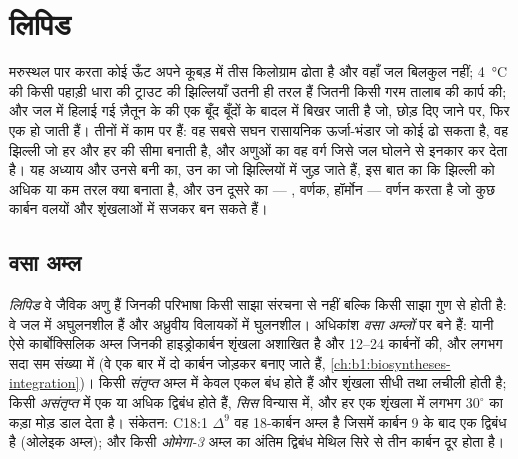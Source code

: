 \chapter{लिपिड}\label{ch:b1:lipids}

मरुस्थल पार करता कोई ऊँट अपने कूबड़ में तीस किलोग्राम  ढोता है और
वहाँ जल बिलकुल नहीं; \qty{4}{\celsius} की किसी पहाड़ी धारा की ट्राउट की
झिल्लियाँ उतनी ही तरल हैं जितनी किसी गरम तालाब की कार्प की; और जल में
हिलाई गई ज़ैतून के  की एक बूँद बूँदों के बादल में बिखर जाती है जो,
छोड़ दिए जाने पर, फिर एक हो जाती हैं। तीनों में  काम पर हैं: वह
सबसे सघन रासायनिक ऊर्जा-भंडार जो कोई  ढो सकता है, वह झिल्ली जो हर
 और हर  की सीमा बनाती है, और अणुओं का वह वर्ग जिसे जल
घोलने से इनकार कर देता है। यह अध्याय  और उनसे बनी  का, उन
  का जो झिल्लियों में जुड़ जाते हैं, इस बात का कि झिल्ली को
अधिक या कम तरल क्या बनाता है, और उन दूसरे  का --- , वर्णक,
हॉर्मोन --- वर्णन करता है जो कुछ कार्बन वलयों और शृंखलाओं में सजकर बन
सकते हैं।

\section{वसा अम्ल}

\begin{definition}[लिपिड, वसा अम्ल]\label{def:b1:lipids:fattyacid}
\emph{लिपिड} वे जैविक अणु हैं जिनकी परिभाषा किसी साझा
संरचना से नहीं बल्कि किसी साझा गुण से होती है: वे जल में अघुलनशील हैं और
अध्रुवीय विलायकों में घुलनशील। अधिकांश \emph{वसा अम्लों}
पर बने हैं: यानी ऐसे कार्बोक्सिलिक अम्ल जिनकी हाइड्रोकार्बन शृंखला
अशाखित है और \qtyrange{12}{24}{} कार्बनों की, और लगभग सदा सम संख्या में
(वे एक बार में दो कार्बन जोड़कर बनाए जाते हैं,
\cref{ch:b1:biosyntheses-integration})। किसी \emph{संतृप्त}  अम्ल में केवल एकल बंध होते हैं और शृंखला सीधी तथा लचीली
होती है; किसी \emph{असंतृप्त} में एक या अधिक
द्विबंध होते हैं, \emph{सिस} विन्यास में, और हर एक शृंखला में लगभग
$30^\circ$ का कड़ा मोड़ डाल देता है। संकेतन: C18:1 $\Delta^9$
वह 18-कार्बन अम्ल है जिसमें कार्बन 9 के बाद एक द्विबंध है (ओलेइक अम्ल);
और किसी \emph{ओमेगा-3} अम्ल का अंतिम द्विबंध मेथिल सिरे से तीन कार्बन
दूर होता है।
\end{definition}


